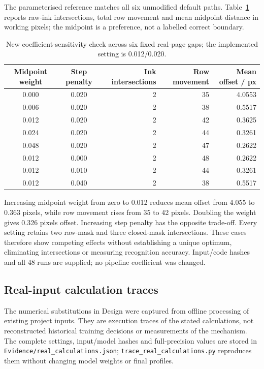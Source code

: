 The parameterised reference matches all six unmodified default paths. Table~\ref{tab:app-seam-sweep} reports raw-ink intersections, total row movement and mean midpoint distance in working pixels; the midpoint is a preference, not a labelled correct boundary.

\begin{table}[!htbp]\centering\small
\begin{tabular}{|c|c|r|r|r|}
\hline Midpoint weight&Step penalty&Ink intersections&Row movement&Mean offset / px\\\hline
0.000&0.020&2&35&4.0553\\\hline
0.006&0.020&2&38&0.5517\\\hline
0.012&0.020&2&42&0.3625\\\hline
0.024&0.020&2&44&0.3261\\\hline
0.048&0.020&2&47&0.2622\\\hline
0.012&0.000&2&48&0.2622\\\hline
0.012&0.010&2&44&0.3261\\\hline
0.012&0.040&2&38&0.5517\\\hline
\end{tabular}
\caption{New coefficient-sensitivity check across six fixed real-page gaps; the implemented setting is 0.012/0.020.}
\label{tab:app-seam-sweep}
\end{table}

Increasing midpoint weight from zero to 0.012 reduces mean offset from 4.055 to 0.363 pixels, while row movement rises from 35 to 42 pixels. Doubling the weight gives 0.326 pixels offset. Increasing step penalty has the opposite trade-off. Every setting retains two raw-mask and three closed-mask intersections. These cases therefore show competing effects without establishing a unique optimum, eliminating intersections or measuring recognition accuracy. Input/code hashes and all 48 runs are supplied; no pipeline coefficient was changed.
\FloatBarrier

\subsection{Real-input calculation traces}\label{app:des-real-calculations}
The numerical substitutions in Design were captured from offline processing of existing project inputs. They are execution traces of the stated calculations, not reconstructed historical training decisions or measurements of the mechanism. The complete settings, input/model hashes and full-precision values are stored in \texttt{Evidence/real\_calculations.json}; \texttt{trace\_real\_calculations.py} reproduces them without changing model weights or final profiles.

